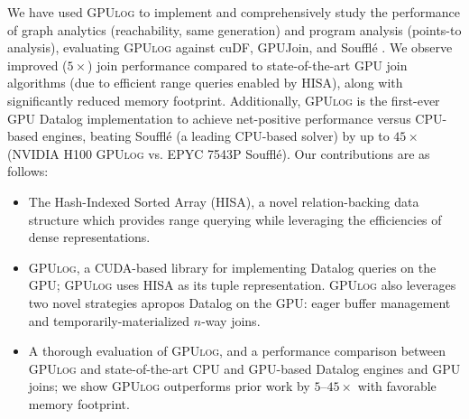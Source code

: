 \documentclass[nonacm,sigplan]{acmart}
\newcommand{\tool}{\textsc{GPUlog}}
\begin{document}
We have used \tool{} to implement and comprehensively study the performance of graph analytics (reachability, same generation) and program analysis (points-to analysis), evaluating \tool{} against cuDF, GPUJoin, and Souffl\'e \cite{cudf, shovon2023towards, jordan2016souffle}. We observe improved ($5\times$) join performance compared to state-of-the-art GPU join algorithms (due to efficient range queries enabled by HISA), along with significantly reduced memory footprint. Additionally, \tool{} is the first-ever GPU Datalog implementation to achieve net-positive performance versus CPU-based engines, beating Souffl\'e (a leading CPU-based solver) by up to $45\times$ (NVIDIA H100 \tool{} vs. EPYC 7543P Souffl\'e). Our contributions are as follows:
\begin{itemize}
\item The Hash-Indexed Sorted Array (HISA), a novel relation-backing data structure which provides range querying while leveraging the efficiencies of dense representations.

\item \tool{}, a CUDA-based library for implementing Datalog queries on the GPU; \tool{} uses HISA as its tuple representation. \tool{} also leverages two novel strategies apropos Datalog on the GPU: eager buffer management and temporarily-materialized $n$-way joins. 

\item A thorough evaluation of \tool{}, and a performance comparison between \tool{} and state-of-the-art CPU and GPU-based Datalog engines and GPU joins; we show \tool{} outperforms prior work by $5$--$45\times$ with favorable memory footprint.




\end{itemize}
\end{document}
